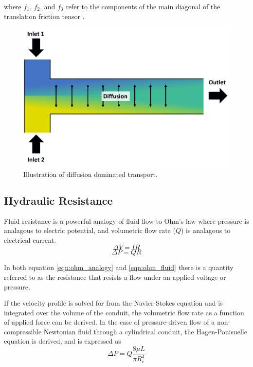 \noindent where $f_1$, $f_2$, and $f_3$ refer to the components of the main diagonal of the translation friction tensor \cite{probstein_physicochemical_2005}. 

\begin{figure}[ht]
    \centering
    \includegraphics[width=\textwidth]{images/diffusion_illustration.png}
    \caption{Illustration of diffusion dominated transport.}
    \label{fig:diffusion_ilustration}
\end{figure} 


\subsection*{Hydraulic Resistance}

\par Fluid resistance is a powerful analogy of fluid flow to Ohm's law where pressure is analagous to electric potential, and volumetric flow rate ($Q$) is analagous to electrical current. 
\begin{equation}
    \Delta V = I R
    \label{eqn:ohm_analogy}
\end{equation}
\begin{equation}
    \Delta P = Q R
    \label{eqn:ohm_fluid}
\end{equation}

\noindent In both equation \ref{eqn:ohm_analogy} and \ref{eqn:ohm_fluid} there is a quantity referred to as the resistance that resists a flow under an applied voltage or pressure. 

\par If the velocity profile is solved for from the Navier-Stokes equation and is integrated over the volume of the conduit, the volumetric flow rate as a function of applied force can be derived. In the case of pressure-driven flow of a non-compressible Newtonian fluid through a cylindrical conduit, the Hagen-Pouisuelle equation is derived, and is expressed as
\begin{equation}
    \Delta P = Q \frac{8\mu L}{\pi R_c^4}
\end{equation}

